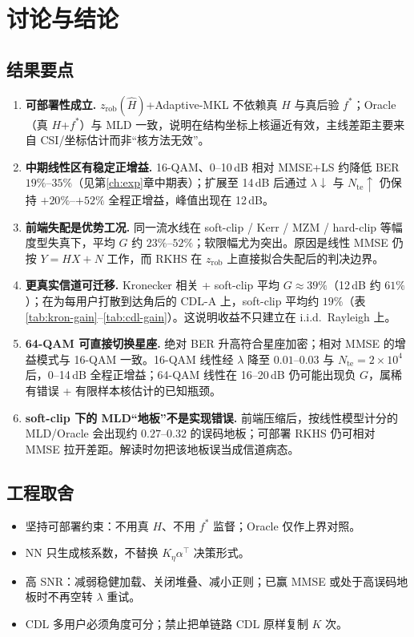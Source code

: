 \chapter{讨论与结论}
\label{ch:discuss}

\section{结果要点}

\begin{enumerate}[leftmargin=2em]
  \item \textbf{可部署性成立.}
  $z_{\mathrm{rob}}(\hat H)$+Adaptive-MKL 不依赖真 $H$ 与真后验 $f^*$；Oracle（真 $H$+$f^*$）与 MLD 一致，说明在结构坐标上核逼近有效，主线差距主要来自 CSI/坐标估计而非“核方法无效”。
  \item \textbf{中期线性区有稳定正增益.}
  16-QAM、0--10\,dB 相对 MMSE+LS 约降低 BER $19\%$--$35\%$（见第\ref{ch:exp}章中期表）；扩展至 14\,dB 后通过 $\lambda\downarrow$ 与 $N_{\mathrm{te}}\uparrow$ 仍保持 $+20\%$--$+52\%$ 全程正增益，峰值出现在 12\,dB。
  \item \textbf{前端失配是优势工况.}
  同一流水线在 soft-clip / Kerr / MZM / hard-clip 等幅度型失真下，平均 $G$ 约 $23\%$--$52\%$；软限幅尤为突出。原因是线性 MMSE 仍按 $Y=HX+N$ 工作，而 RKHS 在 $z_{\mathrm{rob}}$ 上直接拟合失配后的判决边界。
  \item \textbf{更真实信道可迁移.}
  Kronecker 相关 + soft-clip 平均 $G\approx 39\%$（12\,dB 约 $61\%$）；在为每用户打散到达角后的 CDL-A 上，soft-clip 平均约 $19\%$（表\ref{tab:kron-gain}--\ref{tab:cdl-gain}）。这说明收益不只建立在 i.i.d.\ Rayleigh 上。
  \item \textbf{64-QAM 可直接切换星座.}
  绝对 BER 升高符合星座加密；相对 MMSE 的增益模式与 16-QAM 一致。16-QAM 线性经 $\lambda$ 降至 $0.01$--$0.03$ 与 $N_{\mathrm{te}}=2\times10^{4}$ 后，0--14\,dB 全程正增益；64-QAM 线性在 16--20\,dB 仍可能出现负 $G$，属稀有错误 + 有限样本核估计的已知瓶颈。
  \item \textbf{soft-clip 下的 MLD“地板”不是实现错误.}
  前端压缩后，按线性模型计分的 MLD/Oracle 会出现约 $0.27$--$0.32$ 的误码地板；可部署 RKHS 仍可相对 MMSE 拉开差距。解读时勿把该地板误当成信道病态。
\end{enumerate}

\section{工程取舍}

\begin{itemize}[leftmargin=2em]
  \item 坚持可部署约束：不用真 $H$、不用 $f^*$ 监督；Oracle 仅作上界对照。
  \item NN 只生成核系数，不替换 $K_\eta\alpha^\top$ 决策形式。
  \item 高 SNR：减弱稳健加载、关闭堆叠、减小正则；已赢 MMSE 或处于高误码地板时不再空转 $\lambda$ 重试。
  \item CDL 多用户必须角度可分；禁止把单链路 CDL 原样复制 $K$ 次。
\end{itemize}

